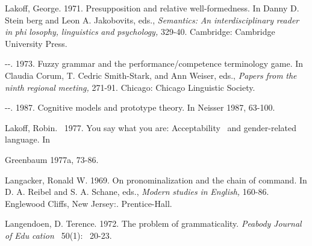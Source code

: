 \begin{styleStandard}
Lakoff, George. 1971. Presupposition and relative well-formedness. In Danny D. Stein\- berg and Leon A. Jakobovits, eds., \textit{Semantics:}\textit{ }\textit{An}\textit{ }\textit{interdisciplinary}\textit{ }\textit{reader in}\textit{ }\textit{phi\-}\textit{ }\textit{losophy,}\textit{ }\textit{linguistics}\textit{ }\textit{and}\textit{ }\textit{psychology,}\textit{ }329-40. Cambridge: Cambridge University Press.
\end{styleStandard}


\begin{listWWNumvileveli}
\item 
\begin{styleStandard}
{}-{}-. 1973. Fuzzy grammar and the performance/competence terminology game. In Claudia Corum, T. Cedric Smith-Stark, and Ann Weiser, eds., \textit{Papers}\textit{ }\textit{from}\textit{ }\textit{the}\textit{ }\textit{ninth}\textit{ }\textit{regional}\textit{ }\textit{meeting,}\textit{ }271-91. Chicago: Chicago Linguistic Society.
\end{styleStandard}


\item 
\begin{styleStandard}
{}-{}-. 1987. Cognitive models and prototype theory. In Neisser 1987, 63-100.
\end{styleStandard}


\end{listWWNumvileveli}
\begin{styleStandard}
Lakoff, Robin. \ 1977. You say what you are: Acceptability \ and gender-related language. In
\end{styleStandard}


\begin{styleStandard}
Greenbaum 1977a, 73-86.
\end{styleStandard}


\begin{styleStandard}
Langacker, Ronald W. 1969. On pronominalization and the chain of command. In D. A. Reibel and S. A. Schane, eds., \textit{Modern}\textit{ }\textit{studies}\textit{ }\textit{in}\textit{ }\textit{English,}\textit{ }160-86. Englewood Cliffs, New Jersey:. Prentice-Hall.
\end{styleStandard}


\begin{styleStandard}
Langendoen, D. Terence. 1972. The problem of grammaticality. \textit{Peabody}\textit{ }\textit{Journal}\textit{ }\textit{of}\textit{ }\textit{Edu\-}\textit{ }\textit{cation }\textit{\ }50(1): \ 20-23.
\end{styleStandard}


